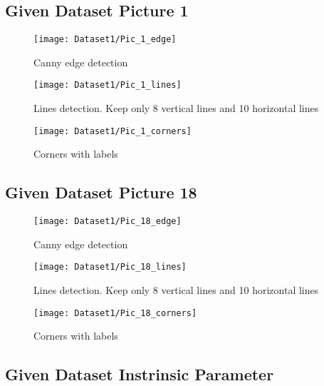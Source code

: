\documentclass[11pt]{article}
\begin{document}

\subsection*{Given Dataset Picture 1}

\begin{figure}[H]
\centering
\texttt{[image: Dataset1/Pic\_1\_edge]}
\caption{Canny edge detection}
\label{}
\end{figure}

\begin{figure}[H]
\centering
\texttt{[image: Dataset1/Pic\_1\_lines]}
\caption{Lines detection. Keep only 8 vertical lines and 10 horizontal lines}
\label{}
\end{figure}

\begin{figure}[H]
\centering
\texttt{[image: Dataset1/Pic\_1\_corners]}
\caption{Corners with labels}
\label{}
\end{figure}


\subsection*{Given Dataset Picture 18}

\begin{figure}[H]
\centering
\texttt{[image: Dataset1/Pic\_18\_edge]}
\caption{Canny edge detection}
\label{}
\end{figure}

\begin{figure}[H]
\centering
\texttt{[image: Dataset1/Pic\_18\_lines]}
\caption{Lines detection. Keep only 8 vertical lines and 10 horizontal lines}
\label{}
\end{figure}

\begin{figure}[H]
\centering
\texttt{[image: Dataset1/Pic\_18\_corners]}
\caption{Corners with labels}
\label{}
\end{figure}



\subsection*{Given Dataset Instrinsic Parameter}
\end{document}
